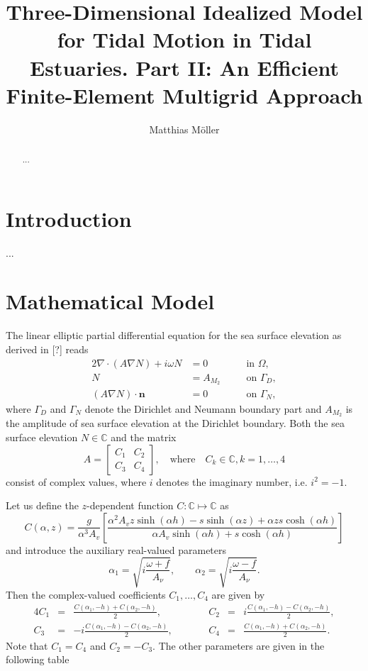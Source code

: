 \documentclass[11pt,a4paper]{article}
\title{Three-Dimensional Idealized Model for Tidal Motion in Tidal Estuaries. Part II: An Efficient Finite-Element Multigrid Approach}
\author{Matthias M\"oller}
\begin{document}
\maketitle

\begin{abstract}
...
\end{abstract}

\section{Introduction}
...

\section{Mathematical Model}

The linear elliptic partial differential equation for the sea surface elevation as derived in [?] reads
\begin{alignat}{2}
\nabla\cdot(A\nabla N)+i\omega N&=0  \quad && \text{in } \Omega,
\label{eq:sse_scalar1}\\
N&=A_{M_2} \quad && \text{on } \Gamma_D,
\label{eq:sse_scalar2}\\
(A\nabla N)\cdot\mathbf{n}&=0 \quad && \text{on } \Gamma_N,
\label{eq:sse_scatar3}
\end{alignat}
where $\Gamma_D$ and $\Gamma_N$ denote the Dirichlet and Neumann boundary part and $A_{M_2}$ is the amplitude of sea surface elevation at the Dirichlet boundary. Both the sea surface elevation $N\in\mathbb{C}$ and the matrix
$$
A=
\begin{bmatrix}
C_1 & C_2\\
C_3 & C_4
\end{bmatrix},\quad\text{where}\quad C_k\in\mathbb{C}, k=1,\dots,4
$$
consist of complex values, where $i$ denotes the imaginary number, i.e. $i^2=-1$.

Let us define the $z$-dependent function $C:\mathbb{C}\mapsto\mathbb{C}$ as
\begin{equation}
C(\alpha,z)=\frac{g}{\alpha^3A_v}\left[\frac{\alpha^2A_vz\sinh(\alpha h)-s\sinh(\alpha z)+\alpha z s \cosh(\alpha h)}{\alpha A_v\sinh(\alpha h)+s\cosh(\alpha h)}\right]
\end{equation}
and introduce the auxiliary real-valued parameters
$$
\alpha_1=\sqrt{i\frac{\omega+f}{A_\nu}},\qquad
\alpha_2=\sqrt{i\frac{\omega-f}{A_\nu}}.
$$
Then the complex-valued coefficients $C_1,\dots,C_4$ are given by
\begin{alignat}{4}
C_1&=&\frac{C(\alpha_1,-h)+C(\alpha_2,-h)}{2},&& \qquad
C_2&=&i\frac{C(\alpha_1,-h)-C(\alpha_2,-h)}{2},\\
C_3&=&-i\frac{C(\alpha_1,-h)-C(\alpha_2,-h)}{2},&&\qquad
C_4&=&\frac{C(\alpha_1,-h)+C(\alpha_2,-h)}{2}.
\end{alignat}
Note that $C_1=C_4$ and $C_2=-C_3$. The other parameters are given in the following table
\end{document}
